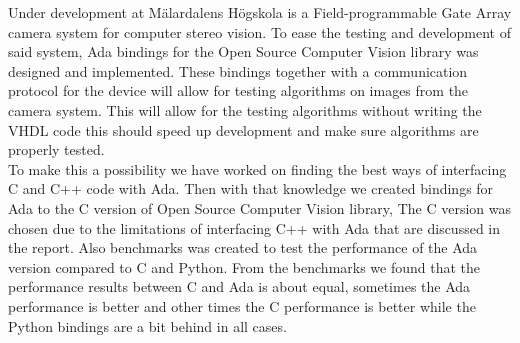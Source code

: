 \abstract
Under development at Mälardalens Högskola is a Field-programmable Gate Array camera system for computer stereo vision. To ease the testing and development of said system, Ada bindings for the Open Source Computer Vision library was designed and implemented. These bindings together with a communication protocol for the device will allow for testing algorithms on images from the camera system. This will allow for the testing algorithms without writing the VHDL code this should speed up development and make sure algorithms are properly tested.
\\
To make this a possibility we have worked on finding the best ways of interfacing C and C++ code with Ada. Then with that knowledge we created bindings for Ada to the C version of Open Source Computer Vision library, The C version was chosen due to the limitations of interfacing C++ with Ada that are discussed in the report. Also benchmarks was created to test the performance of the Ada version compared to C and Python. From the benchmarks we found that the performance results between C and Ada is about equal, sometimes the Ada performance is better and other times the C performance is better while the Python bindings are a bit behind in all cases. 
